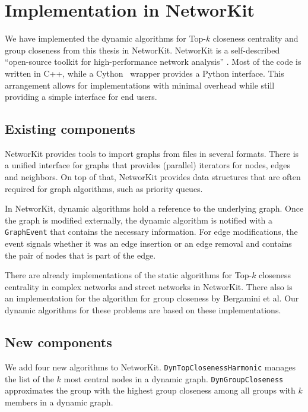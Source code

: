 \chapter{Implementation in NetworKit}
\label{ch:implementation}

We have implemented the dynamic algorithms for Top-$k$ closeness centrality and group closeness from this thesis in NetworKit. NetworKit is a self-described ``open-source toolkit for high-performance network analysis'' \cite{staudt2014networkit}. Most of the code is written in C++, while a Cython~\cite{behnel2010cython} wrapper provides a Python interface. This arrangement allows for implementations with minimal overhead while still providing a simple interface for end users.

\section{Existing components}

NetworKit provides tools to import graphs from files in several formats. There is a unified interface for graphs that provides (parallel) iterators for nodes, edges and neighbors. On top of that, NetworKit provides data structures that are often required for graph algorithms, such as priority queues.

In NetworKit, dynamic algorithms hold a reference to the underlying graph. Once the graph is modified externally, the dynamic algorithm is notified with a \texttt{GraphEvent} that contains the necessary information. For edge modifications, the event signals whether it was an edge insertion or an edge removal and contains the pair of nodes that is part of the edge.

There are already implementations of the static algorithms for Top-$k$ closeness centrality in complex networks and street networks in NetworKit. There also is an implementation for the algorithm for group closeness by Bergamini et al. Our dynamic algorithms for these problems are based on these implementations.

\section{New components}
We add four new algorithms to NetworKit. \texttt{DynTopClosenessHarmonic} manages the list of the $k$ most central nodes in a dynamic graph. \texttt{DynGroupCloseness} approximates the group with the highest group closeness among all groups with $k$ members in a dynamic graph. 

